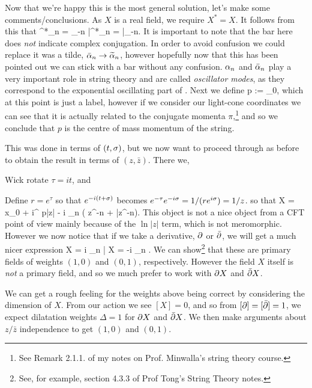 Now that we're happy this is the most general solution, let's make some comments/conclusions. As $X$ is a real field, we require $X^*=X$. It follows from this that 
\be 
\label{eqn:AlphaComplexConjugate}
    \a^*_n = \a_{-n} \qand \bar{\a}^*_n = \bar{\a}_{-n}. 
\ee 
It is important to note that the bar here does \textit{not} indicate complex conjugation. In order to avoid confusion we could replace it was a tilde, $\bar{\alpha}_n \to \widetilde{\alpha}_n$, however hopefully now that this has been pointed out we can stick with a bar without any confusion. $\alpha_n$ and $\bar{\alpha}_n$ play a very important role in string theory and are called \textit{oscillator modes}, as they correspond to the exponential oscillating part of . Next we define  
\be 
\label{eqn:Palpha0}
    p :=  \a_0,
\ee
which at this point is just a label, however if we consider our light-cone coordinates we can see that it is actually related to the conjugate momenta $\pi$,\footnote{See Remark 2.1.1. of my notes on Prof. Minwalla's string theory course.} and so we conclude that $p$ is the centre of mass momentum of the string.

This was done in terms of $(t,\sigma)$, but we now want to proceed through as before to obtain the result in terms of $(z,\bar{z})$. There we,
\ben[label=(\roman*)]
    \item Wick rotate $\tau=it$, and
    \item Define $r=e^{\tau}$ so that $e^{-i(t+\sigma)}$ becomes $e^{-\tau}e^{-i\sigma} = 1/(re^{i\sigma}) = 1/z$. 
\een 
so that
\bse 
    X = x_0 + i\a^{\prime} p\ln|z| - i \sum_{n} \bigg(  z^{-n} +  \bar{z}^{-n}\bigg).
\ese 
This object is not a nice object from a CFT point of view mainly because of the $\ln|z|$ term, which is not meromorphic. However we now notice that if we take a derivative, $\partial$ or $\bar{\partial}$, we will get a much nicer expression
\bse 
    \p X = i  \sum_{n}  \qand \bar{\p} X = -i  \sum_{n} .
\ese 
We can show\footnote{See, for example, section 4.3.3 of Prof Tong's String Theory notes.} that these are primary fields of weights $(1,0)$ and $(0,1)$, respectively. However the field $X$ itself is \textit{not} a primary field, and so we much prefer to work with $\partial X$ and $\bar{\partial}X$.

\br 
    We can get a rough feeling for the weights above being correct by considering the dimension of $X$. From our action we see $[X]=0$, and so from $[\partial]=[\bar{\partial}]=1$, we expect dilatation weights $\Delta=1$ for $\partial X$ and $\bar{\partial}X$. We then make arguments about $z/\bar{z}$ independence to get $(1,0)$ and $(0,1)$.
\er 


